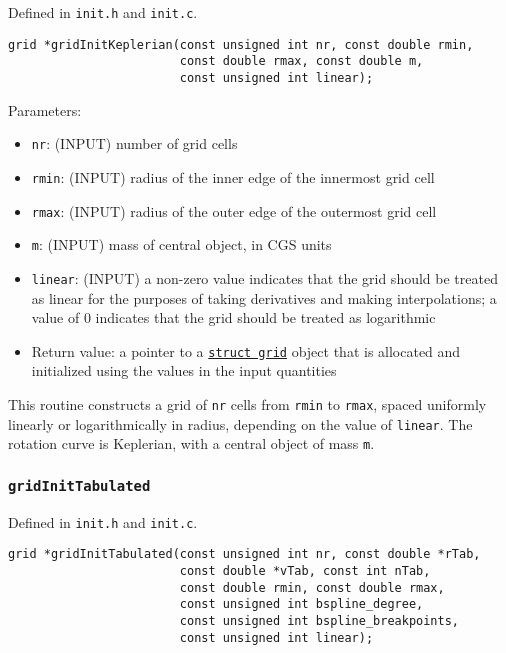\documentclass[12pt]{article}
\begin{document}
Defined in \verb=init.h= and \verb=init.c=.

\begin{verbatim}
grid *gridInitKeplerian(const unsigned int nr, const double rmin, 
                        const double rmax, const double m, 
                        const unsigned int linear);
\end{verbatim}

Parameters:
\begin{itemize}
\item \texttt{nr}: (INPUT) number of grid cells
\item \texttt{rmin}: (INPUT) radius of the inner edge of the innermost grid cell
\item \texttt{rmax}: (INPUT) radius of the outer edge of the outermost grid cell
\item \texttt{m}: (INPUT) mass of central object, in CGS units
\item \texttt{linear}: (INPUT) a non-zero value indicates that the grid should be treated as linear for the purposes of taking derivatives and making interpolations; a value of 0 indicates that the grid should be treated as logarithmic
\item Return value: a pointer to a \hyperref[sssec:datastructures]{\texttt{struct grid}} object that is allocated and initialized using the values in the input quantities
\end{itemize}

This routine constructs a grid of \verb=nr= cells from \verb=rmin= to \verb=rmax=, spaced uniformly linearly or logarithmically in radius, depending on the value of \verb=linear=. The rotation curve is Keplerian, with a central object of mass \verb=m=.

\subsubsection{\texttt{gridInitTabulated}}
\label{sssec:gridInitTabulated}

Defined in \verb=init.h= and \verb=init.c=.

\begin{verbatim}
grid *gridInitTabulated(const unsigned int nr, const double *rTab, 
                        const double *vTab, const int nTab,
                        const double rmin, const double rmax,
                        const unsigned int bspline_degree,
                        const unsigned int bspline_breakpoints,
                        const unsigned int linear);
\end{verbatim}
\end{document}
